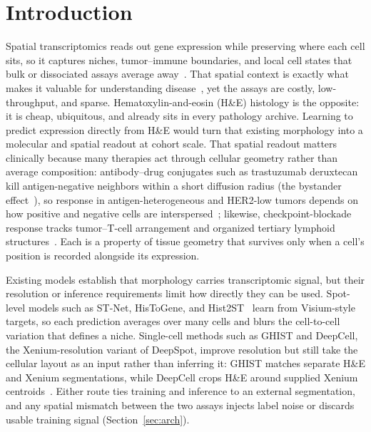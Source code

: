 \documentclass[11pt]{article}
\begin{document}
{\parskip=0pt\small\tableofcontents}

\section{Introduction}

Spatial transcriptomics reads out gene expression while preserving where each
cell sits, so it captures niches, tumor--immune boundaries, and local cell
states that bulk or dissociated assays average away~\cite{spatial_review_natbiotech}.
That spatial context is exactly what makes it valuable for understanding
disease~\cite{spatial_pathology_ajp},
yet the assays are costly, low-throughput, and sparse. Hematoxylin-and-eosin
(H\&E) histology is the opposite: it is cheap, ubiquitous, and already sits in
every pathology archive. Learning to predict expression directly from H\&E would
turn that existing morphology into a molecular and spatial readout at cohort
scale. That spatial readout matters clinically because many therapies act
through cellular geometry rather than average composition: antibody--drug
conjugates such as trastuzumab deruxtecan kill antigen-negative neighbors within
a short diffusion radius (the bystander
effect~\cite{ogitani_bystander,staudacher_bystander}), so response in
antigen-heterogeneous and HER2-low tumors depends on how positive and negative
cells are interspersed~\cite{destiny_b04}; likewise, checkpoint-blockade response
tracks tumor--T-cell arrangement and organized tertiary lymphoid
structures~\cite{chen_mellman,cabrita_tls,helmink_tls}. Each is a property of
tissue geometry that survives only when a cell's position is recorded alongside
its expression.

Existing models establish that morphology carries transcriptomic signal, but
their resolution or inference requirements limit how directly they can be used.
Spot-level models such as ST-Net, HisToGene, and
Hist2ST~\cite{stnet,histogene,hist2st} learn from Visium-style targets, so each
prediction averages over many cells and blurs the cell-to-cell variation that
defines a niche. Single-cell methods such as GHIST and DeepCell, the
Xenium-resolution variant of DeepSpot, improve resolution but still take the
cellular layout as an input rather than inferring it: GHIST matches separate
H\&E and Xenium segmentations, while DeepCell crops
H\&E around supplied Xenium centroids~\cite{ghist,deepcell}. Either route ties
training and inference to an external segmentation, and any spatial mismatch
between the two assays injects label noise or discards usable training signal
(Section~\ref{sec:arch}).
\end{document}
